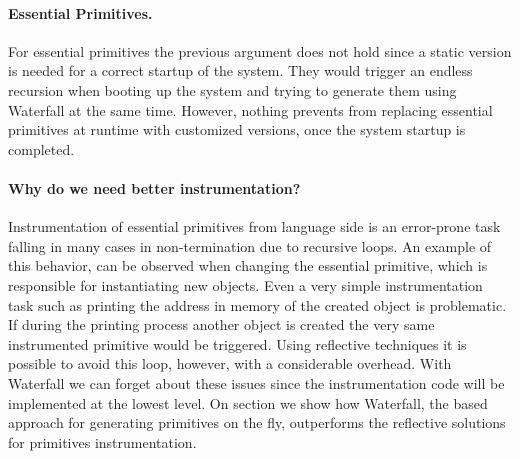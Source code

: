 \paragraph{Essential Primitives.}
For essential primitives the previous argument does not hold since a static version is needed for a correct startup of the system.
They would trigger an endless recursion when booting up the system and trying to generate them using Waterfall at the same time.
However, nothing prevents from replacing essential primitives at runtime with customized versions, once the system startup is completed. 

\paragraph{Why do we need better instrumentation?}
Instrumentation of essential primitives from language side is an error-prone task falling in many cases in non-termination due to recursive loops. 
An example of this behavior, can be observed when changing the essential  primitive, which is responsible for instantiating new objects.
Even a very simple instrumentation task such as printing the address in memory of the created object is problematic.
If during the printing process another object is created the very same instrumented  primitive would be triggered.
Using reflective techniques it is possible to avoid this loop, however, with a considerable overhead.
With Waterfall we can forget about these issues since the instrumentation code will be implemented at the lowest level.
On section  we show how Waterfall, the \B based approach for generating primitives on the fly, outperforms the reflective solutions for primitives instrumentation. 

%
%

